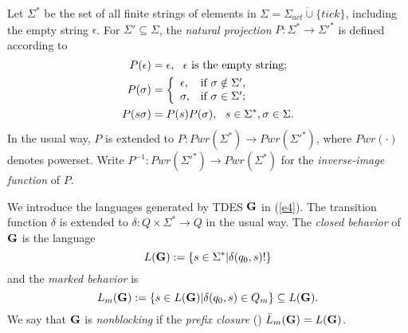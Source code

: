 \documentclass[twocolumn]{autart}
\begin{document}
Let $\Sigma^*$ be the set of all finite strings of elements in
$\Sigma = \Sigma_{act} \dot\cup \{tick\}$, including the empty
string $\epsilon$.  For $\Sigma' \subseteq \Sigma$, the
\emph{natural projection} $P : \Sigma^* \rightarrow \Sigma'^*$ is
defined according to
\begin{equation} \label{eq:natpro}
\begin{split}
P(\epsilon) &= \epsilon, \ \ \epsilon \mbox{ is the empty string;} \\
P(\sigma) &= \left\{
  \begin{array}{ll}
    \epsilon, & \hbox{if $\sigma \notin \Sigma'$,} \\
    \sigma, & \hbox{if $\sigma \in \Sigma'$;}
  \end{array}
\right.\\
P(s\sigma) &= P(s)P(\sigma),\ \ s \in \Sigma^*, \sigma \in \Sigma.
\end{split}
\end{equation}
In the usual way, $P$ is extended to $P : Pwr(\Sigma^*) \rightarrow
Pwr(\Sigma'^*)$, where $Pwr(\cdot)$ denotes powerset. Write $P^{-1}
: Pwr(\Sigma'^*) \rightarrow Pwr(\Sigma^*)$ for the
\emph{inverse-image function} of $P$.

We introduce the languages generated by TDES $\bf G$ in (\ref{e4}). The transition
function $\delta$ is extended to $\delta:Q\times \Sigma^*
\rightarrow Q$ in the usual way. The {\it closed behavior} of $\bf
G$ is the language
\begin{equation} \label{e6}
L({\bf G}) := \{s \in \Sigma^*|\delta(q_0,s)!\}
\end{equation}
and the {\it marked behavior} is
\begin{equation} \label{e7}
L_m({\bf G}) := \{s \in L({\bf G})| \delta(q_0, s) \in Q_m\} \subseteq L({\bf G}).
\end{equation}
We say that $\bf G$ is \emph{nonblocking} if the {\it prefix
closure} (\cite{Wonham:2011a}) $\bar{L}_m({\bf G}) = L({\bf G})$.
\end{document}
